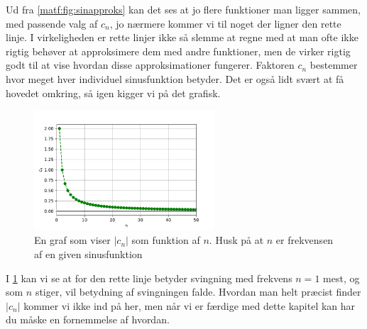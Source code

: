 \documentclass[crop=false, class=memoir]{standalone}
\begin{document}
Ud fra \cref{matf:fig:sinapproks} kan det ses at jo flere funktioner man ligger sammen, med passende valg af $c_n$, jo nærmere kommer vi til noget der ligner den rette linje. I virkeligheden er rette linjer ikke så slemme at regne med at man ofte ikke rigtig behøver at approksimere dem med andre funktioner, men de virker rigtig godt til at vise hvordan disse approksimationer fungerer. Faktoren $c_n$ bestemmer hvor meget hver individuel sinusfunktion betyder. Det er også lidt svært at få hovedet omkring, så igen kigger vi på det grafisk.
\begin{figure}[H]
	\centering
	\includegraphics[width=0.6\textwidth]{Fysisk_Matematik/fig/cn.pdf}
	\caption{En graf som viser $|c_n|$ som funktion af $n$. Husk på at $n$ er frekvensen af en given sinusfunktion}
	\label{matf:fig:cn_koeff}
\end{figure}
I \cref{matf:fig:cn_koeff} kan vi se at for den rette linje betyder svingning med frekvens $n=1$ mest, og som $n$ stiger, vil betydning af svingningen falde. Hvordan man helt præcist finder $|c_n|$ kommer vi ikke ind på her, men når vi er færdige med dette kapitel kan har du måske en fornemmelse af hvordan.
\end{document}
